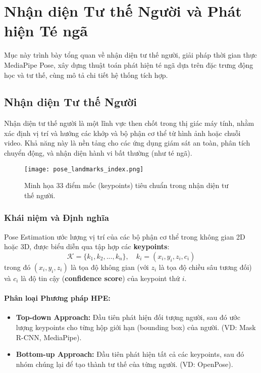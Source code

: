 \section{Nhận diện Tư thế Người và Phát hiện Té ngã}
\label{sec:pose_fall_system}

Mục này trình bày tổng quan về nhận diện tư thế người, giải pháp thời gian thực MediaPipe Pose, xây dựng thuật toán phát hiện té ngã dựa trên đặc trưng động học và tư thế, cùng mô tả chi tiết hệ thống tích hợp.

\subsection{Nhận diện Tư thế Người}

Nhận diện tư thế người là một lĩnh vực then chốt trong thị giác máy tính, nhằm xác định vị trí và hướng các khớp và bộ phận cơ thể từ hình ảnh hoặc chuỗi video. Khả năng này là nền tảng cho các ứng dụng giám sát an toàn, phân tích chuyển động, và nhận diện hành vi bất thường (như té ngã).


\begin{figure}[H]
    \centering
    \texttt{[image: pose\_landmarks\_index.png]}
    \caption{Minh họa 33 điểm mốc (keypoints) tiêu chuẩn trong nhận diện tư thế người.}
\end{figure}

\subsubsection{Khái niệm và Định nghĩa}

Pose Estimation ước lượng vị trí của các bộ phận cơ thể trong không gian 2D hoặc 3D, được biểu diễn qua tập hợp các \textbf{keypoints}:
\begin{equation}
\mathcal{K} = \{k_1, k_2, ..., k_n\}, \quad k_i = (x_i, y_i, z_i, c_i)
\end{equation}
trong đó $(x_i, y_i, z_i)$ là tọa độ không gian (với $z_i$ là tọa độ chiều sâu tương đối) và $c_i$ là độ tin cậy (\textbf{confidence score}) của keypoint thứ $i$.

\paragraph{Phân loại Phương pháp HPE:}
\begin{itemize}
    \item \textbf{Top-down Approach:} Đầu tiên phát hiện đối tượng người, sau đó ước lượng keypoints cho từng hộp giới hạn (bounding box) của người. (VD: Mask R-CNN, MediaPipe).
    \item \textbf{Bottom-up Approach:} Đầu tiên phát hiện tất cả các keypoints, sau đó nhóm chúng lại để tạo thành tư thế của từng người. (VD: OpenPose).
\end{itemize}

